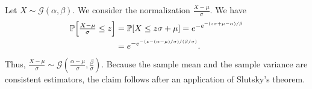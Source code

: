 \documentclass[10pt,journal,compsoc]{IEEEtran}
\theoremstyle{definition}
\begin{document}
\begin{IEEEproof}
  Let $ X \sim \mathcal{G}(\alpha, \beta)$. We consider the
  normalization $\tfrac{X - \mu}{\sigma}$. We have
  \begin{equation*}
    \begin{split}
    \mathbb{P}\Bigl[ \tfrac{X - \mu}{\sigma} \leq z\Bigr]  &= \mathbb{P}[X \leq z
    \sigma + \mu] 
    = e^{-e^{-(z \sigma + \mu - \alpha)/\beta}} \\
      &= e^{- e^{-(z - (\alpha - \mu)/\sigma)/(\beta/\sigma)}}.
    \end{split}
  \end{equation*}
  Thus, $\tfrac{X - \mu}{\sigma} \sim \mathcal{G}(\tfrac{\alpha -
    \mu}{\sigma}, \tfrac{\beta}{\sigma})$. Because the sample
  mean and the sample variance are consistent estimators, the claim
  follows after an application of Slutsky's theorem.
\end{IEEEproof}
\end{document}
